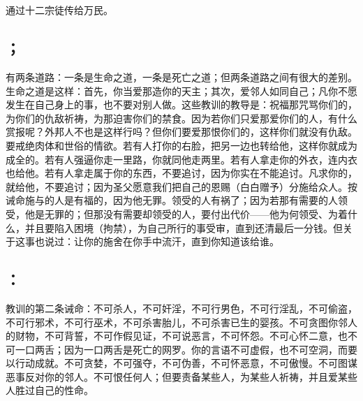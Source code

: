 
\chapter{}


通过十二宗徒传给万民。\par


\section{；}

有两条道路：一条是生命之道，一条是死亡之道；但两条道路之间有很大的差别。生命之道是这样：首先，你当爱那造你的天主；其次，爱邻人如同自己；凡你不愿发生在自己身上的事，也不要对别人做。这些教训的教导是：祝福那咒骂你们的，为你们的仇敌祈祷，为那迫害你们的禁食。因为若你们只爱那爱你们的人，有什么赏报呢？外邦人不也是这样行吗？但你们要爱那恨你们的，这样你们就没有仇敌。要戒绝肉体和世俗的情欲。若有人打你的右脸，把另一边也转给他，这样你就成为成全的。若有人强逼你走一里路，你就同他走两里。若有人拿走你的外衣，连内衣也给他。若有人拿走属于你的东西，不要追讨，因为你实在不能追讨。凡求你的，就给他，不要追讨；因为圣父愿意我们把自己的恩赐（白白赠予）分施给众人。按诫命施与的人是有福的，因为他无罪。领受的人有祸了；因为若那有需要的人领受，他是无罪的；但那没有需要却领受的人，要付出代价——他为何领受、为着什么，并且要陷入困境（拘禁），为自己所行的事受审，直到还清最后一分钱。但关于这事也说过：让你的施舍在你手中流汗，直到你知道该给谁。\par


\section{：}

教训的第二条诫命：不可杀人，不可奸淫，不可行男色，不可行淫乱，不可偷盗，不可行邪术，不可行巫术，不可杀害胎儿，不可杀害已生的婴孩。不可贪图你邻人的财物，不可背誓，不可作假见证，不可说恶言，不可怀怨。不可心怀二意，也不可一口两舌；因为一口两舌是死亡的网罗。你的言语不可虚假，也不可空洞，而要以行动成就。不可贪婪，不可强夺，不可伪善，不可怀恶意，不可傲慢。不可图谋恶事反对你的邻人。不可恨任何人；但要责备某些人，为某些人祈祷，并且爱某些人胜过自己的性命。\par


